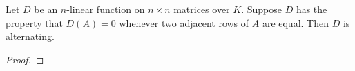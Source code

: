 \begin{lemma}
    Let \(D\) be an \(n\)-linear function on \(n\times n\) matrices over \(K\). Suppose \(D\) has the property that \(D\left(A\right)=0\) whenever two adjacent rows of \(A\) are equal. Then \(D\) is alternating.
\end{lemma}

\begin{proof}
\end{proof}

